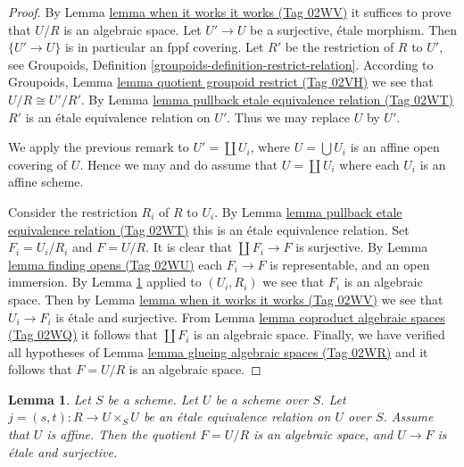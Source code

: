 \documentclass{amsart}
\theoremstyle{plain}
\newtheorem{lemma}[subsection]{Lemma}
\theoremstyle{definition}
\theoremstyle{remark}
\numberwithin{equation}{subsection}
\begin{document}
\begin{proof}
By Lemma \href{https://stacks.math.columbia.edu/tag/02WV}{lemma when it works it works (Tag 02WV)}
it suffices to prove that $U/R$ is an algebraic space.
Let $U' \to U$ be a surjective, \'etale morphism.
Then $\{U' \to U\}$ is in particular an fppf covering.
Let $R'$ be the restriction of $R$ to $U'$, see
Groupoids, Definition \ref{groupoids-definition-restrict-relation}.
According to
Groupoids, Lemma \href{https://stacks.math.columbia.edu/tag/02VH}{lemma quotient groupoid restrict (Tag 02VH)}
we see that $U/R \cong U'/R'$.
By Lemma \href{https://stacks.math.columbia.edu/tag/02WT}{lemma pullback etale equivalence relation (Tag 02WT)} $R'$ is an
\'etale equivalence relation on $U'$. Thus we may replace $U$ by $U'$.

\medskip\noindent
We apply the previous remark to $U' = \coprod U_i$, where
$U = \bigcup U_i$ is an affine open covering of $U$. Hence we
may and do assume that $U = \coprod U_i$ where
each $U_i$ is an affine scheme.

\medskip\noindent
Consider the restriction $R_i$ of $R$ to $U_i$.
By Lemma \href{https://stacks.math.columbia.edu/tag/02WT}{lemma pullback etale equivalence relation (Tag 02WT)}
this is an \'etale equivalence relation.
Set $F_i = U_i/R_i$ and $F = U/R$.
It is clear that $\coprod F_i \to F$ is surjective.
By Lemma \href{https://stacks.math.columbia.edu/tag/02WU}{lemma finding opens (Tag 02WU)} each $F_i \to F$
is representable, and an open immersion.
By Lemma \ref{spaces-lemma-presentation-quasi-compact}
applied to $(U_i, R_i)$ we see that $F_i$ is an algebraic space.
Then by Lemma \href{https://stacks.math.columbia.edu/tag/02WV}{lemma when it works it works (Tag 02WV)} we see that
$U_i \to F_i$ is \'etale and surjective.
From Lemma \href{https://stacks.math.columbia.edu/tag/02WQ}{lemma coproduct algebraic spaces (Tag 02WQ)}
it follows that $\coprod F_i$ is an algebraic space.
Finally, we have verified all
hypotheses of Lemma \href{https://stacks.math.columbia.edu/tag/02WR}{lemma glueing algebraic spaces (Tag 02WR)}
and it follows that $F = U/R$ is an algebraic space.
\end{proof}


\begin{lemma}
\label{spaces-lemma-presentation-quasi-compact}
Let $S$ be a scheme.
Let $U$ be a scheme over $S$.
Let $j = (s, t) : R \to U \times_S U$
be an \'etale equivalence relation on $U$ over $S$.
Assume that $U$ is affine. Then the quotient $F = U/R$
is an algebraic space, and $U \to F$ is \'etale and surjective.
\end{lemma}
\end{document}
